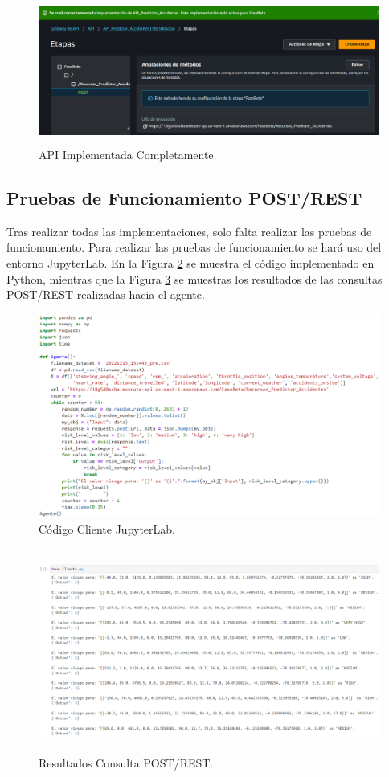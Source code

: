 \documentclass[a4paper,10pt, oneside, titlepage]{article}
\begin{document}
	\begin{figure}[!h]
		\centering
		\includegraphics[width = 1\linewidth, height = 4.8cm]{API_Implementada_Completa.png}
		\caption{API Implementada Completamente.}
		\label{API_Implementada_Completa}
	\end{figure}
	\subsection{Pruebas de Funcionamiento POST/REST}
	Tras realizar todas las implementaciones, solo falta realizar las pruebas de funcionamiento. Para realizar las pruebas de funcionamiento se hará uso del entorno JupyterLab. En la Figura \ref{Codigo_Cliente_JupyterLab} se muestra el código implementado en Python, mientras que la Figura \ref{Comando_Ejecucion} se muestras los resultados de las consultas POST/REST realizadas hacia el agente.
	\begin{figure}[!h]
		\centering
		\includegraphics[width = 1\linewidth, height = 6.7cm]{Codigo_Cliente_JupyterLab.png}
		\caption{Código Cliente JupyterLab.}
		\label{Codigo_Cliente_JupyterLab}
	\end{figure}
	\begin{figure}[!h]
		\centering
		\includegraphics[width = 1\linewidth, height = 6.7cm]{Comando_Ejecucion.png}
		\caption{Resultados Consulta POST/REST.}
		\label{Comando_Ejecucion}
	\end{figure} \\
\end{document}
